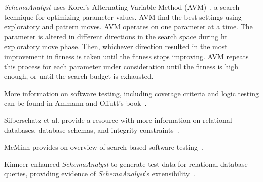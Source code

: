 
\textit{SchemaAnalyst} uses Korel's Alternating Variable Method (AVM)~\cite{Korel:AVM}, a search technique for
optimizing parameter values. AVM find the best settings using exploratory and pattern moves. AVM operates on one
parameter at a time. The parameter is altered in different directions in the search space during ht exploratory move
phase.  Then, whichever direction resulted in the most improvement in fitness is taken until the fitness stops
improving. AVM repeats this process for each parameter under consideration until the fitness is high enough, or until
the search budget is exhausted.



More information on software testing, including coverage criteria and logic testing can be found in Ammann and Offutt's
book~\cite{ammann2008}.

Silberschatz et al. provide a resource with more information on relational databases, database schemas, and integrity
constraints~\cite{databasebook}.

McMinn provides on overview of search-based software testing~\cite{STVR:STVR294}.

Kinneer enhanced \textit{SchemaAnalyst} to generate test data for relational database queries, providing evidence of
\textit{SchemaAnalyst}'s extensibility~\cite{kinneer2016comp}.
